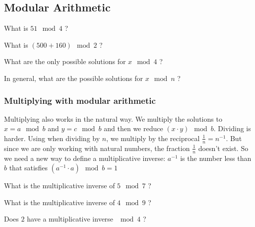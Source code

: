 \documentclass[11pt,a4paper]{report}
\begin{document}
\subsection{Modular Arithmetic}

\begin{ex}
What is $51\mod 4$ ?
\end{ex}

\begin{ex}
What is $(500 + 160) \mod 2$ ?
\end{ex}


\begin{ex}
What are the only possible solutions for $x\mod 4$ ?
\end{ex}


\begin{ex}
In general, what are the possible solutions for $x\mod n$ ?
\end{ex}


\subsubsection{Multiplying with modular arithmetic}

Multiplying also works in the natural way. We multiply the solutions to $x = a\mod b$ and $y = c \mod b$ and then we reduce $(x\cdot y) \mod b$.
Dividing is harder. Using when dividing by $n$, we multiply by the reciprocal $\frac{1}{n}=n^{-1}$. But since we are only working with natural numbers, the fraction $\frac{1}{n}$ doesn’t exist. So we need a new way to
define a multiplicative inverse:
$a^{-1}$ is the number less than $b$ that satisfies $(a^{-1}\cdot a) \mod b = 1$


\begin{ex}
What is the multiplicative inverse of $5\mod 7$ ?
\end{ex}

\begin{ex}
What is the multiplicative inverse of $4\mod 9$ ?
\end{ex}

\begin{ex}
Does $2$ have a multiplicative inverse $\mod 4$ ?
\end{ex}
\end{document}
